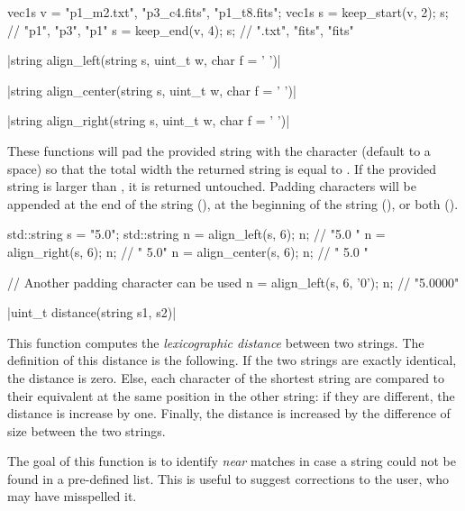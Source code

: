 {\begin{example}
\begin{cppcode}
vec1s v = {"p1_m2.txt", "p3_c4.fits", "p1_t8.fits"};
vec1s s = keep_start(v, 2);
s; // {"p1", "p3", "p1"}
s = keep_end(v, 4);
s; // {".txt", "fits", "fits"}
\end{cppcode}
\end{example}

\funcitem \vectorfunc \cppinline|string align_left(string s, uint_t w, char f = ' ')| 

\vectorfunc \cppinline|string align_center(string s, uint_t w, char f = ' ')| 

\vectorfunc \cppinline|string align_right(string s, uint_t w, char f = ' ')| 

These functions will pad the provided string with the character  (default to a space) so that the total width the returned string is equal to . If the provided string is larger than , it is returned untouched. Padding characters will be appended at the end of the string (), at the beginning of the string (), or both ().

\begin{example}
\begin{cppcode}
std::string s = "5.0";
std::string n = align_left(s, 6);
n; // "5.0   "
n = align_right(s, 6);
n; // "   5.0"
n = align_center(s, 6);
n; // " 5.0  "

// Another padding character can be used
n = align_left(s, 6, '0');
n; // "5.0000"
\end{cppcode}
\end{example}

\funcitem \vectorfunc \cppinline|uint_t distance(string s1, s2)| 

This function computes the \emph{lexicographic distance} between two strings. The definition of this distance is the following. If the two strings are exactly identical, the distance is zero. Else, each character of the shortest string are compared to their equivalent at the same position in the other string: if they are different, the distance is increase by one. Finally, the distance is increased by the difference of size between the two strings.

The goal of this function is to identify \emph{near} matches in case a string could not be found in a pre-defined list. This is useful to suggest corrections to the user, who may have misspelled it.

}
